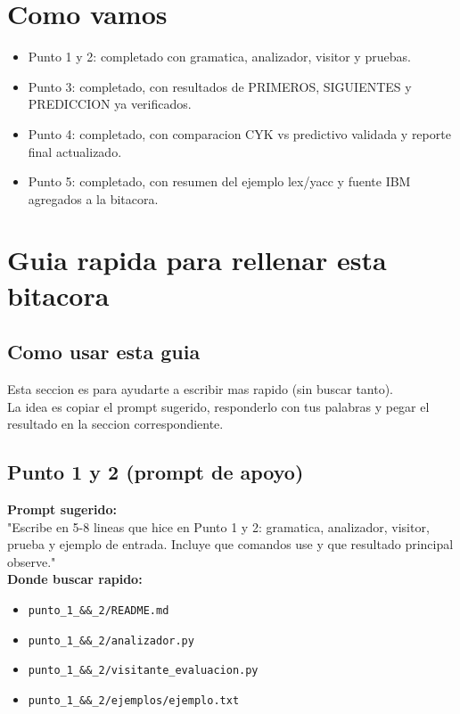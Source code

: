 \documentclass[12pt,a4paper]{article}
\begin{document}
\section{Como vamos}
\begin{itemize}
    \item Punto 1 y 2: completado con gramatica, analizador, visitor y pruebas.
    \item Punto 3: completado, con resultados de PRIMEROS, SIGUIENTES y PREDICCION ya verificados.
    \item Punto 4: completado, con comparacion CYK vs predictivo validada y reporte final actualizado.
    \item Punto 5: completado, con resumen del ejemplo lex/yacc y fuente IBM agregados a la bitacora.
\end{itemize}

\section{Guia rapida para rellenar esta bitacora}
\subsection*{Como usar esta guia}
Esta seccion es para ayudarte a escribir mas rapido (sin buscar tanto).\\
La idea es copiar el prompt sugerido, responderlo con tus palabras y pegar el resultado en la seccion correspondiente.

\subsection*{Punto 1 y 2 (prompt de apoyo)}
\textbf{Prompt sugerido:} \\
"Escribe en 5-8 lineas que hice en Punto 1 y 2: gramatica, analizador, visitor, prueba y ejemplo de entrada. Incluye que comandos use y que resultado principal observe."\\
\textbf{Donde buscar rapido:}
\begin{itemize}
    \item \texttt{punto\_1\_\&\&\_2/README.md}
    \item \texttt{punto\_1\_\&\&\_2/analizador.py}
    \item \texttt{punto\_1\_\&\&\_2/visitante\_evaluacion.py}
    \item \texttt{punto\_1\_\&\&\_2/ejemplos/ejemplo.txt}
\end{itemize}
\end{document}
